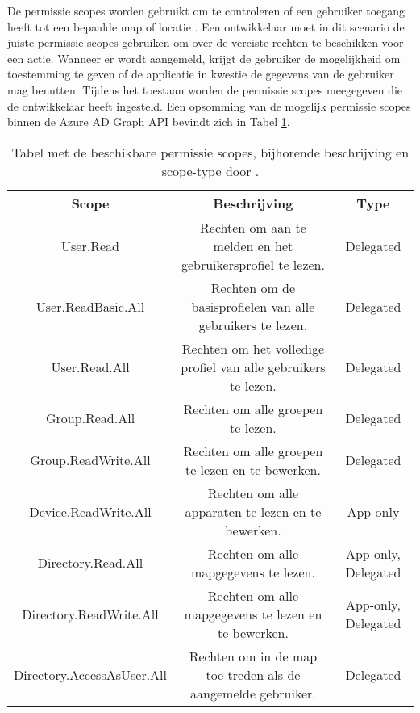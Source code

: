 De permissie scopes worden gebruikt om te controleren of een gebruiker toegang heeft tot een bepaalde map of locatie \autocite{Microsoft2016a}. Een ontwikkelaar moet in dit scenario de juiste permissie scopes gebruiken om over de vereiste rechten te beschikken voor een actie. Wanneer er wordt aangemeld, krijgt de gebruiker de mogelijkheid om toestemming te geven of de applicatie in kwestie de gegevens van de gebruiker mag benutten. Tijdens het toestaan worden de permissie scopes meegegeven die de ontwikkelaar heeft ingesteld. Een opsomming van de mogelijk permissie scopes binnen de Azure \ac{AD} Graph \ac{API} bevindt zich in Tabel \ref{psaad}. \\

\begin{table}[ht]
    \centering
    \begin{adjustbox}{width=1\textwidth}
    \begin{tabular}{ |c|c|c| }
        \hline
        \textbf{Scope} & \textbf{Beschrijving} & \textbf{Type} \\
        \hline
        User.Read & Rechten om aan te melden en het gebruikersprofiel te lezen. & Delegated \\
        User.ReadBasic.All & Rechten om de basisprofielen van alle gebruikers te lezen. & Delegated \\
        User.Read.All & Rechten om het volledige profiel van alle gebruikers te lezen. & Delegated \\
        Group.Read.All & Rechten om alle groepen te lezen. & Delegated \\
        Group.ReadWrite.All & Rechten om alle groepen te lezen en te bewerken. & Delegated \\
        Device.ReadWrite.All & Rechten om alle apparaten te lezen en te bewerken. & App-only \\
        Directory.Read.All & Rechten om alle mapgegevens te lezen. & App-only, Delegated \\
        Directory.ReadWrite.All & Rechten om alle mapgegevens te lezen en te bewerken. & App-only, Delegated \\
        Directory.AccessAsUser.All & Rechten om in de map toe treden als de aangemelde gebruiker. & Delegated \\
        \hline
    \end{tabular}
    \end{adjustbox}
    \caption[Tabel Azure AD Graph Permission scopes]{Tabel met de beschikbare permissie scopes, bijhorende beschrijving en scope-type door \textcite{Microsoft2016a}.}
    \label{psaad}
\end{table}

